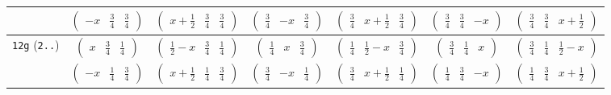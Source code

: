 \documentclass[fleqn,9pt,landscape]{jsarticle}
\begin{document}
\begin{center}
\begin{longtable}{ccccccc}
& $ \begin{pmatrix} - x & \frac{3}{4} & \frac{3}{4} \end{pmatrix} $ & $ \begin{pmatrix} x + \frac{1}{2} & \frac{3}{4} & \frac{3}{4} \end{pmatrix} $ & $ \begin{pmatrix} \frac{3}{4} & - x & \frac{3}{4} \end{pmatrix} $ & $ \begin{pmatrix} \frac{3}{4} & x + \frac{1}{2} & \frac{3}{4} \end{pmatrix} $ & $ \begin{pmatrix} \frac{3}{4} & \frac{3}{4} & - x \end{pmatrix} $ & $ \begin{pmatrix} \frac{3}{4} & \frac{3}{4} & x + \frac{1}{2} \end{pmatrix} $ \\ \hline
{\tt 12g} ({\tt 2..}) & $ \begin{pmatrix} x & \frac{3}{4} & \frac{1}{4} \end{pmatrix} $ & $ \begin{pmatrix} \frac{1}{2} - x & \frac{3}{4} & \frac{1}{4} \end{pmatrix} $ & $ \begin{pmatrix} \frac{1}{4} & x & \frac{3}{4} \end{pmatrix} $ & $ \begin{pmatrix} \frac{1}{4} & \frac{1}{2} - x & \frac{3}{4} \end{pmatrix} $ & $ \begin{pmatrix} \frac{3}{4} & \frac{1}{4} & x \end{pmatrix} $ & $ \begin{pmatrix} \frac{3}{4} & \frac{1}{4} & \frac{1}{2} - x \end{pmatrix} $ \\
& $ \begin{pmatrix} - x & \frac{1}{4} & \frac{3}{4} \end{pmatrix} $ & $ \begin{pmatrix} x + \frac{1}{2} & \frac{1}{4} & \frac{3}{4} \end{pmatrix} $ & $ \begin{pmatrix} \frac{3}{4} & - x & \frac{1}{4} \end{pmatrix} $ & $ \begin{pmatrix} \frac{3}{4} & x + \frac{1}{2} & \frac{1}{4} \end{pmatrix} $ & $ \begin{pmatrix} \frac{1}{4} & \frac{3}{4} & - x \end{pmatrix} $ & $ \begin{pmatrix} \frac{1}{4} & \frac{3}{4} & x + \frac{1}{2} \end{pmatrix} $ \\ \hline

\end{longtable}
\end{center}
\end{document}

